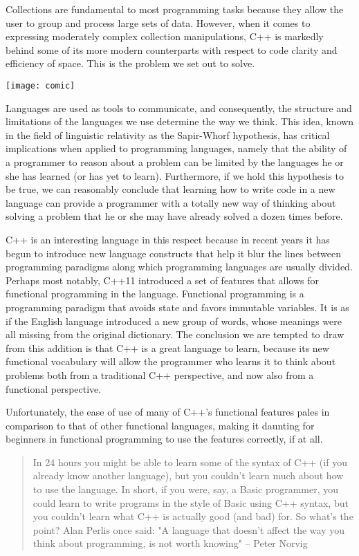 

Collections are fundamental to most programming tasks because they allow the user to group and process large sets of data.
However, when it comes to expressing moderately complex collection manipulations, C++ is markedly behind some of its more modern counterparts with respect to code clarity and efficiency of space.
This is the problem we set out to solve.

\texttt{[image: comic]}


Languages are used as tools to communicate, and consequently, the structure and limitations of the languages we use determine the way we think.
This idea, known in the field of linguistic relativity as the Sapir-Whorf hypothesis\cite{linguistic_relativity}, has critical implications when applied to programming languages, namely that the ability of a programmer to reason about a problem can be limited by the languages he or she has learned (or has yet to learn).
Furthermore, if we hold this hypothesis to be true, we can reasonably conclude that learning how to write code in a new language can provide a programmer with a totally new way of thinking about solving a problem that he or she may have already solved a dozen times before.

C++ is an interesting language in this respect because in recent years it has begun to introduce new language constructs that help it blur the lines between programming paradigms along which programming languages are usually divided.
Perhaps most notably, C++11 introduced a set of features that allows for functional programming in the language.
Functional programming is a programming paradigm that avoids state and favors immutable variables.
It is as if the English language introduced a new group of words, whose meanings were all missing from the original dictionary.
The conclusion we are tempted to draw from this addition is that C++ is a great language to learn, because its new functional vocabulary will allow the programmer who learns it to think about problems both from a traditional C++ perspective, and now also from a functional perspective.

Unfortunately, the ease of use of many of C++'s functional features pales in comparison to that of other functional languages, making it daunting for beginners in functional programming to use the features correctly, if at all.

\blockquote{In 24 hours you might be able to learn some of the syntax of C++ (if you already know another language), but you couldn't learn much about how to use the language. In short, if you were, say, a Basic programmer, you could learn to write programs in the style of Basic using C++ syntax, but you couldn't learn what C++ is actually good (and bad) for. So what's the point? Alan Perlis once said: "A language that doesn't affect the way you think about programming, is not worth knowing" -- Peter Norvig\cite{norvig}
}

